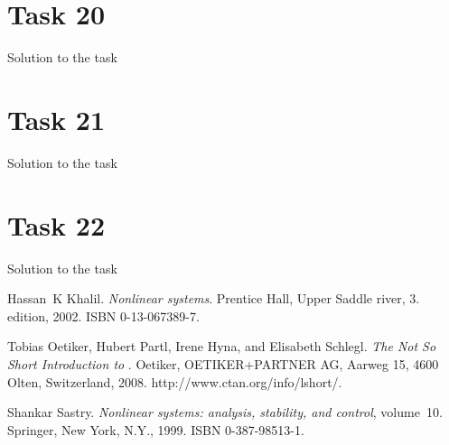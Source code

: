 \documentclass[a4paper,12pt,oneside,onecolumn]{article} %
\begin{document}
\section*{Task 20}

Solution to the task

\section*{Task 21}

Solution to the task

\section*{Task 22}

Solution to the task




\begin{thebibliography}{99}
Hassan~K Khalil.
\newblock \emph{Nonlinear systems}.
\newblock Prentice Hall, Upper Saddle river, 3. edition, 2002.
\newblock ISBN 0-13-067389-7.

Tobias Oetiker, Hubert Partl, Irene Hyna, and Elisabeth Schlegl.
\newblock \emph{The Not So Short Introduction to \LaTeXe}.
\newblock Oetiker, OETIKER+PARTNER AG, Aarweg 15, 4600 Olten, Switzerland,
  2008.
\newblock http://www.ctan.org/info/lshort/.

Shankar Sastry.
\newblock \emph{Nonlinear systems: analysis, stability, and control},
  volume~10.
\newblock Springer, New York, N.Y., 1999.
\newblock ISBN 0-387-98513-1.
\end{thebibliography}
\end{document}
